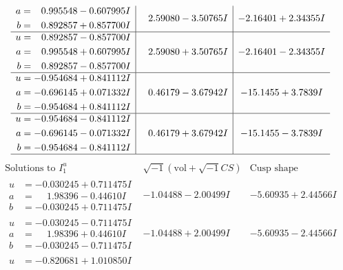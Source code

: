 \documentclass[1p]{elsarticle_modified}
\theoremstyle{definition}
\newcommand{\I}{\sqrt{-1}}
\begin{document}
$$\begin{array}{c|c|c}
\begin{aligned}
a &= \phantom{-}0.995548 - 0.607995 I \\
b &= \phantom{-}0.892857 + 0.857700 I\end{aligned}
 & \phantom{-}2.59080 - 3.50765 I & -2.16401 + 2.34355 I \\ \hline\begin{aligned}
u &= \phantom{-}0.892857 - 0.857700 I \\
a &= \phantom{-}0.995548 + 0.607995 I \\
b &= \phantom{-}0.892857 - 0.857700 I\end{aligned}
 & \phantom{-}2.59080 + 3.50765 I & -2.16401 - 2.34355 I \\ \hline\begin{aligned}
u &= -0.954684 + 0.841112 I \\
a &= -0.696145 + 0.071332 I \\
b &= -0.954684 + 0.841112 I\end{aligned}
 & \phantom{-}0.46179 - 3.67942 I & -15.1455 + 3.7839 I \\ \hline\begin{aligned}
u &= -0.954684 - 0.841112 I \\
a &= -0.696145 - 0.071332 I \\
b &= -0.954684 - 0.841112 I\end{aligned}
 & \phantom{-}0.46179 + 3.67942 I & -15.1455 - 3.7839 I\\
 \hline 
 \end{array}$$\newpage$$\begin{array}{c|c|c}  
\text{Solutions to }I^u_{1}& \I (\text{vol} + \sqrt{-1}CS) & \text{Cusp shape}\\
 \hline 
\begin{aligned}
u &= -0.030245 + 0.711475 I \\
a &= \phantom{-}1.98396 - 0.44610 I \\
b &= -0.030245 + 0.711475 I\end{aligned}
 & -1.04488 - 2.00499 I & -5.60935 + 2.44566 I \\ \hline\begin{aligned}
u &= -0.030245 - 0.711475 I \\
a &= \phantom{-}1.98396 + 0.44610 I \\
b &= -0.030245 - 0.711475 I\end{aligned}
 & -1.04488 + 2.00499 I & -5.60935 - 2.44566 I \\ \hline\begin{aligned}
u &= -0.820681 + 1.010850 I \\

\end{aligned}
\end{array}$$
\end{document}
